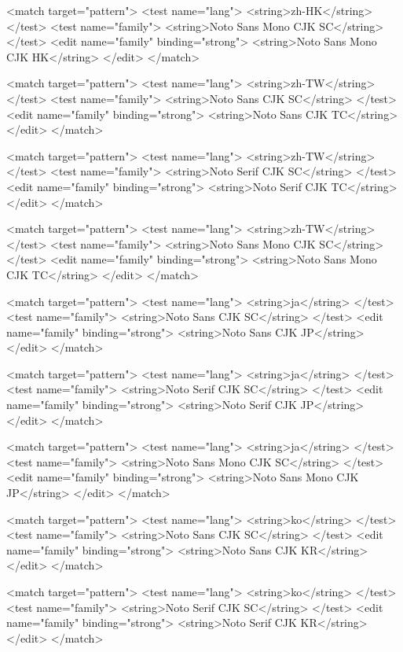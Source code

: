\begin{lstcode}[numbers=none]
  <match target="pattern">
    <test name="lang">
      <string>zh-HK</string>
    </test>
    <test name="family">
      <string>Noto Sans Mono CJK SC</string>
    </test>
    <edit name="family" binding="strong">
      <string>Noto Sans Mono CJK HK</string>
    </edit>
  </match>

  <match target="pattern">
    <test name="lang">
      <string>zh-TW</string>
    </test>
    <test name="family">
      <string>Noto Sans CJK SC</string>
    </test>
    <edit name="family" binding="strong">
      <string>Noto Sans CJK TC</string>
    </edit>
  </match>

  <match target="pattern">
    <test name="lang">
      <string>zh-TW</string>
    </test>
    <test name="family">
      <string>Noto Serif CJK SC</string>
    </test>
    <edit name="family" binding="strong">
      <string>Noto Serif CJK TC</string>
    </edit>
  </match>

  <match target="pattern">
    <test name="lang">
      <string>zh-TW</string>
    </test>
    <test name="family">
      <string>Noto Sans Mono CJK SC</string>
    </test>
    <edit name="family" binding="strong">
      <string>Noto Sans Mono CJK TC</string>
    </edit>
  </match>

  <match target="pattern">
    <test name="lang">
      <string>ja</string>
    </test>
    <test name="family">
      <string>Noto Sans CJK SC</string>
    </test>
    <edit name="family" binding="strong">
      <string>Noto Sans CJK JP</string>
    </edit>
  </match>

  <match target="pattern">
    <test name="lang">
      <string>ja</string>
    </test>
    <test name="family">
      <string>Noto Serif CJK SC</string>
    </test>
    <edit name="family" binding="strong">
      <string>Noto Serif CJK JP</string>
    </edit>
  </match>

  <match target="pattern">
    <test name="lang">
      <string>ja</string>
    </test>
    <test name="family">
      <string>Noto Sans Mono CJK SC</string>
    </test>
    <edit name="family" binding="strong">
      <string>Noto Sans Mono CJK JP</string>
    </edit>
  </match>

  <match target="pattern">
    <test name="lang">
      <string>ko</string>
    </test>
    <test name="family">
      <string>Noto Sans CJK SC</string>
    </test>
    <edit name="family" binding="strong">
      <string>Noto Sans CJK KR</string>
    </edit>
  </match>

  <match target="pattern">
    <test name="lang">
      <string>ko</string>
    </test>
    <test name="family">
      <string>Noto Serif CJK SC</string>
    </test>
    <edit name="family" binding="strong">
      <string>Noto Serif CJK KR</string>
    </edit>
  </match>


\end{lstcode}
